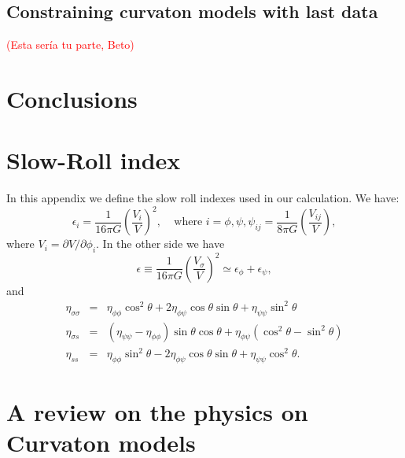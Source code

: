 \documentclass[amssymb,twocolumn,prd,nofootinbib,showpacs]{revtex4-1}
\begin{document}
\subsection{Constraining curvaton models with last data}
\textcolor{red}{(Esta ser\'ia tu parte, Beto)}
\section{Conclusions}\label{conclusions}
\appendix
\section{Slow-Roll index}

In this appendix we define the slow roll indexes used in our calculation. We have:
\begin{subequations}
\begin{equation}
\epsilon_i = \frac{1}{16 \pi G}\left(\frac{V_i}{V}\right)^2, \ \ \ \ \ \text{where $i=\phi,\psi$},
\end{equation}
\begin{equation}
\psi_{ij}=\frac{1}{8\pi G}\left(\frac{V_{ij}}{V}\right),
\end{equation}
\end{subequations}
where $V_i = \partial V/\partial \phi_i$. In the other side we have
\begin{equation}
\epsilon \equiv \frac{1}{16\pi G}\left(\frac{V_\sigma}{V}\right)^2\simeq \epsilon_\phi+\epsilon_\psi,
\end{equation}
and
\begin{eqnarray}
\eta_{\sigma\sigma}&=&\eta_{\phi\phi}\cos^2\theta + 2\eta_{\phi\psi}\cos\theta\sin\theta+\eta_{\psi\psi}\sin^2\theta\nonumber \\
\eta_{\sigma s}&=&(\eta_{\psi\psi}-\eta_{\phi\phi})\sin\theta\cos\theta + \eta_{\phi\psi}(\cos^2\theta-\sin^2\theta)\\
\eta_{ss}&=&\eta_{\phi\phi}\sin^2\theta - 2\eta_{\phi\psi}\cos\theta\sin\theta+\eta_{\psi\psi}\cos^2\theta\nonumber .
\end{eqnarray}
\section{A review on the physics on Curvaton models}
\end{document}
